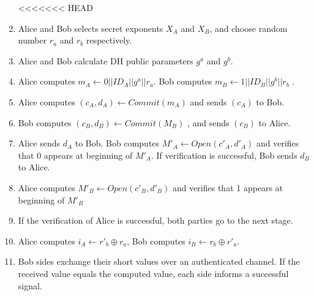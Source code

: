 \begin{enumerate}
<<<<<<< HEAD
\item Alice and Bob selects secret exponents $X_A$ and $X_B$, and choose random number $r_a$ and $r_b$ respectively. 
\item Alice and Bob calculate DH public parameters $g^a$ and $g^b$. 
\item Alice computes $m_A \leftarrow 0||ID_A||g^a||r_a$. Bob computes $m_B \leftarrow 1||ID_B||g^b||r_b$ .
\item Alice computes $(c_A,d_A) \leftarrow Commit(m_A)$ and sends $(c_A)$ to Bob.
\item Bob computes $(c_B,d_B) \leftarrow Commit(M_B)$ , and sends $(c_B)$ to Alice.
\item Alice sends $d_A$ to Bob. Bob computes $M'_A \leftarrow Open(c'_A,d'_A)$ and verifies that 0 appears at beginning of $M'_A$. If verification is successful, Bob sends $d_B$ to Alice.
\item Alice computes $M'_B \leftarrow Open(c'_B,d'_B)$ and verifies that 1 appears at beginning of $M'_B$
 \item If the verification of Alice is successful, both parties go to the next stage.
\item Alice computes $i_A \leftarrow r'_b \oplus r_a$, Bob computes $i_B \leftarrow r_b \oplus r'_a$.
\item Bob sides exchange their short values over an authenticated channel. If the received value equals the computed value, each side informs a successful signal. 
\end{enumerate}

